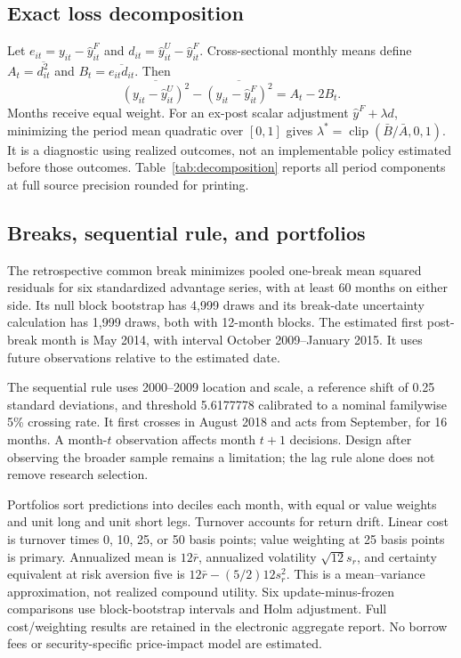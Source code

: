 \documentclass[11pt]{article}
\begin{document}
\subsection{Exact loss decomposition}
Let $e_{it}=y_{it}-\hat y^F_{it}$ and $d_{it}=\hat y^U_{it}-\hat y^F_{it}$. Cross-sectional monthly means define $A_t=\overline{d_{it}^2}$ and $B_t=\overline{e_{it}d_{it}}$. Then
\begin{equation}
\overline{(y_{it}-\hat y^U_{it})^2}-\overline{(y_{it}-\hat y^F_{it})^2}=A_t-2B_t.
\end{equation}
Months receive equal weight. For an ex-post scalar adjustment $\hat y^F+\lambda d$, minimizing the period mean quadratic over $[0,1]$ gives $\lambda^*=\operatorname{clip}(\bar B/\bar A,0,1)$. It is a diagnostic using realized outcomes, not an implementable policy estimated before those outcomes. Table~\ref{tab:decomposition} reports all period components at full source precision rounded for printing.



\subsection{Breaks, sequential rule, and portfolios}
The retrospective common break minimizes pooled one-break mean squared residuals for six standardized advantage series, with at least 60 months on either side. Its null block bootstrap has 4,999 draws and its break-date uncertainty calculation has 1,999 draws, both with 12-month blocks. The estimated first post-break month is May 2014, with interval October 2009--January 2015. It uses future observations relative to the estimated date.

The sequential rule uses 2000--2009 location and scale, a reference shift of 0.25 standard deviations, and threshold 5.6177778 calibrated to a nominal familywise 5\% crossing rate. It first crosses in August 2018 and acts from September, for 16 months. A month-$t$ observation affects month $t+1$ decisions. Design after observing the broader sample remains a limitation; the lag rule alone does not remove research selection.

Portfolios sort predictions into deciles each month, with equal or value weights and unit long and unit short legs. Turnover accounts for return drift. Linear cost is turnover times 0, 10, 25, or 50 basis points; value weighting at 25 basis points is primary. Annualized mean is $12\bar r$, annualized volatility $\sqrt{12}s_r$, and certainty equivalent at risk aversion five is $12\bar r-(5/2)12s_r^2$. This is a mean--variance approximation, not realized compound utility. Six update-minus-frozen comparisons use block-bootstrap intervals and Holm adjustment. Full cost/weighting results are retained in the electronic aggregate report. No borrow fees or security-specific price-impact model are estimated.
\end{document}
